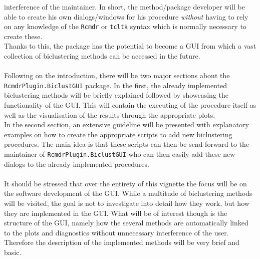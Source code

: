 \documentclass[a4paper]{article}\usepackage[]{graphicx}\usepackage[]{color}
\begin{document}
interference of the maintainer. In short, the method/package developer will be
able to create his own dialogs/windows for his procedure {\it without} having to
rely on any knowledge of the \verb|Rcmdr| or \verb|tcltk| syntax which is
normally necessary to create these.\\ 
Thanks to this, the package has the potential to become a GUI from which a
vast collection of biclustering methods can be accessed in the future.
\\ \\
Following on the introduction, there will be two major sections about the
\verb|RcmdrPlugin.BiclustGUI| package. In the first, the already implemented
biclustering methods will be briefly explained followed by showcasing the
functionality of the GUI. This will contain the executing of the procedure
itself as well as the visualisation of the results through the appropriate
plots.\\
In the second section, an extensive guideline will be presented with explanatory
examples on how to create the appropriate scripts to add new biclustering
procedures. The main idea is that these scripts can then be send forward to the
maintainer of \verb|RcmdrPlugin.BiclustGUI| who can then easily add these new
dialogs to the already implemented procedures.
\\ \\
It should be stressed that over the entirety of this vignette the focus will be
on the software development of the GUI. While a multitude of biclustering methods
will be visited, the goal is not to investigate into detail how they work, but
how they are implemented in the GUI. What will be of interest though is the
structure of the GUI, namely how the several methods are automatically linked to
the plots and diagnostics without unnecessary interference of the user.
Therefore the description of the implemented methods will be very brief and
basic.
\end{document}
